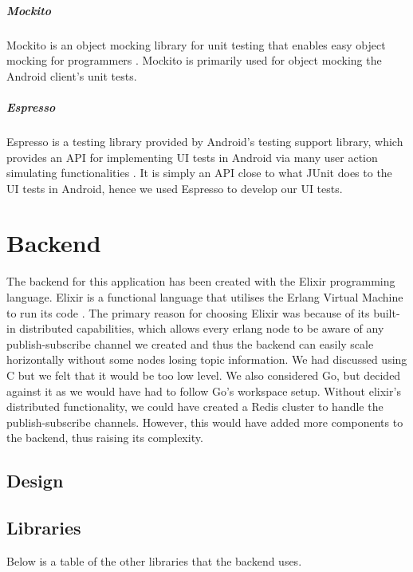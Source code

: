 \documentclass[11pt,a4paper]{report}
\begin{document}
\subparagraph{Mockito}
Mockito is an object mocking library for unit testing that enables easy object mocking for programmers \cite {website:mockito_homepage}. Mockito is primarily used for object mocking the Android client’s unit tests.
\subparagraph{Espresso}
Espresso is a testing library provided by Android’s testing support library, which provides an API for implementing UI tests in Android via many user action simulating functionalities \cite{website:espresso_homepage}. It is simply an API close to what JUnit does to the UI tests in Android, hence we used Espresso to develop our UI tests.

\section{Backend}

The backend for this application has been created with the Elixir programming language. Elixir is a functional language that utilises the Erlang Virtual Machine to run its code \cite{website:elixir_homepage}. The primary reason for choosing Elixir was because of its built-in distributed capabilities, which allows every erlang node to be aware of any publish-subscribe channel we created and thus the backend can easily scale horizontally without some nodes losing topic information. We had discussed using C but we felt that it would be too low level. We also considered Go, but decided against it as we would have had to follow Go's workspace setup.  Without elixir's distributed functionality, we could have created a Redis cluster to handle the publish-subscribe channels. However, this would have added more components to the backend, thus raising its complexity.


\subsection{Design}


\subsection{Libraries}

Below is a table of the other libraries that the backend uses.
\end{document}
